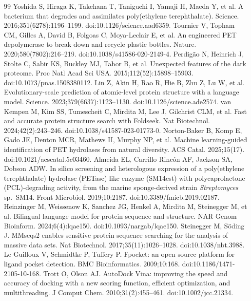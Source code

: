 \documentclass[10pt]{article}
\begin{document}
\begin{thebibliography}{99}
\small
{} Yoshida S, Hiraga K, Takehana T, Taniguchi I, Yamaji H, Maeda Y, et al. A bacterium that degrades and assimilates poly(ethylene terephthalate). Science. 2016;351(6278):1196--1199. doi:10.1126/science.aad6359.
 Tournier V, Topham CM, Gilles A, David B, Folgoas C, Moya-Leclair E, et al. An engineered PET depolymerase to break down and recycle plastic bottles. Nature. 2020;580(7802):216--219. doi:10.1038/s41586-020-2149-4.
 Perdig\~ao N, Heinrich J, Stolte C, Sabir KS, Buckley MJ, Tabor B, et al. Unexpected features of the dark proteome. Proc Natl Acad Sci USA. 2015;112(52):15898--15903. doi:10.1073/pnas.1508380112.
 Lin Z, Akin H, Rao R, Hie B, Zhu Z, Lu W, et al. Evolutionary-scale prediction of atomic-level protein structure with a language model. Science. 2023;379(6637):1123--1130. doi:10.1126/science.ade2574.
 van Kempen M, Kim SS, Tumescheit C, Mirdita M, Lee J, Gilchrist CLM, et al. Fast and accurate protein structure search with Foldseek. Nat Biotechnol. 2024;42(2):243--246. doi:10.1038/s41587-023-01773-0.
 Norton-Baker B, Komp E, Gado JE, Denton MCR, Mathews II, Murphy NP, et al. Machine learning-guided identification of PET hydrolases from natural diversity. ACS Catal. 2025;15(17). doi:10.1021/acscatal.5c03460.
 Almeida EL, Carrillo Rinc\'on AF, Jackson SA, Dobson ADW. In silico screening and heterologous expression of a poly(ethylene terephthalate) hydrolase (PETase)-like enzyme (SM14est) with polycaprolactone (PCL)-degrading activity, from the marine sponge-derived strain \emph{Streptomyces} sp.\ SM14. Front Microbiol. 2019;10:2187. doi:10.3389/fmicb.2019.02187.
 Heinzinger M, Weissenow K, Sanchez JG, Henkel A, Mirdita M, Steinegger M, et al. Bilingual language model for protein sequence and structure. NAR Genom Bioinform. 2024;6(4):lqae150. doi:10.1093/nargab/lqae150.
 Steinegger M, S\"oding J. MMseqs2 enables sensitive protein sequence searching for the analysis of massive data sets. Nat Biotechnol. 2017;35(11):1026--1028. doi:10.1038/nbt.3988.
 Le Guilloux V, Schmidtke P, Tuffery P. Fpocket: an open source platform for ligand pocket detection. BMC Bioinformatics. 2009;10:168. doi:10.1186/1471-2105-10-168.
 Trott O, Olson AJ. AutoDock Vina: improving the speed and accuracy of docking with a new scoring function, efficient optimization, and multithreading. J Comput Chem. 2010;31(2):455--461. doi:10.1002/jcc.21334.

\end{thebibliography}
\end{document}
